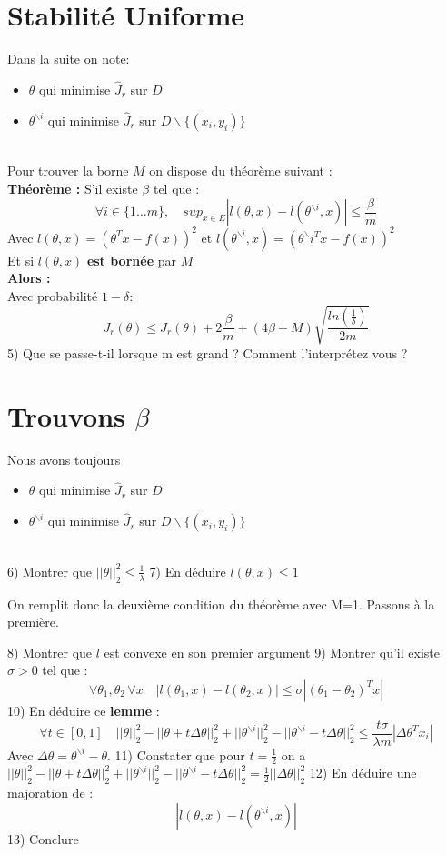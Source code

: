 \documentclass[12pt]{article}
\begin{document}
\section{ Stabilité Uniforme }   
Dans la suite on note:   
\begin{itemize}
\item $\theta$ qui minimise $\hat{J}_r$ sur $D$ 
\item $\theta^{ \backslash i}$  qui minimise $\hat{J}_r$ sur $D \backslash \{(x_i,y_i)\}$       
   
\end{itemize} \ \\

Pour trouver la borne $M$ on dispose du théorème suivant :  \\ 
\textbf{Théorème :} S'il existe $\beta$ tel que :  
$$ \forall i \in \{1 \dots m \},  \quad sup_{x \in E} |l(\theta,x)-l(\theta^{ \backslash i},x)| \leq \frac{\beta}{m}$$   
Avec $l(\theta,x) = (\theta^{T} x - f(x))^2$ et    $l(\theta^{\backslash i},x) = (\theta^\backslash{i}^{T} x - f(x))^2$    \\
Et si $l(\theta,x)$ \textbf{est bornée} par $M$  \\
\textbf{Alors :}    \\
Avec probabilité $1-\delta$:     
$$ J_r(\theta) \leq \hat{J}_r(\theta) + 2 \frac{\beta}{m} + (4\beta + M)\sqrt{\frac{ln(\frac{1}{\delta})}{2m}} $$   
5) Que se passe-t-il lorsque m est grand ? Comment l'interprétez vous ?
\newpage
\section{Trouvons $\beta$}
Nous avons toujours    
\begin{itemize}
\item $\theta$ qui minimise $\hat{J}_r$ sur $D$ 
\item $\theta^{ \backslash i}$  qui minimise $\hat{J}_r$ sur $D \backslash \{(x_i,y_i)\}$       
   
\end{itemize} \ \\
6) Montrer que $||\theta||^2_2 \leq \frac{1}{\lambda}$    
7) En déduire $l(\theta,x) \leq 1$      
    
On remplit donc la deuxième condition du théorème avec M=1.    
Passons à la première.   
    
8) Montrer que $l$ est convexe en son premier argument   
9) Montrer qu'il existe $\sigma > 0$ tel que :
$$ \forall \theta_1,\theta_2 \, \forall x \quad |l(\theta_1,x)-l(\theta_2,x)| \leq \sigma |(\theta_1 - \theta_2)^T x|$$      
10) En déduire ce \textbf{lemme} :      
$$ \forall t \in [0,1] \quad ||\theta||^2_2 - ||\theta + t \Delta \theta||_2^2 + ||\theta^{ \backslash i}||_2^2 - ||\theta^{ \backslash i} - t \Delta \theta||_2^2 \leq \frac{t \sigma}{\lambda m}|\Delta \theta^T x_i| $$   
Avec $\Delta \theta = \theta^{ \backslash i} - \theta$.    
11) Constater que pour $t=\frac{1}{2}$ on a $||\theta||^2_2 - ||\theta + t \Delta \theta||_2^2 + ||\theta^{ \backslash i}||_2^2 - ||\theta^{ \backslash i} - t \Delta \theta||_2^2 = \frac{1}{2}||\Delta \theta||^2_2$   
12) En déduire une majoration de : 
$$ |l(\theta,x)-l(\theta^{ \backslash i},x)| $$    
13) Conclure
\end{document}
